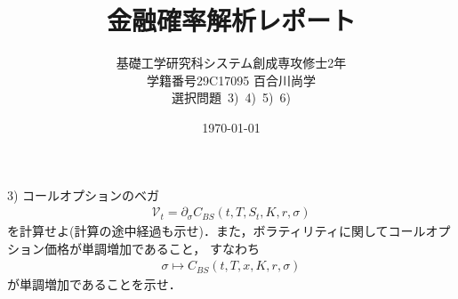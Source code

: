 \documentclass[11pt,a4paper]{jsarticle}
\title{金融確率解析レポート}
\author{基礎工学研究科システム創成専攻修士2年\\学籍番号29C17095 百合川尚学\\選択問題\ 3)\ 4)\ 5)\ 6)}
\date{\today}
\theoremstyle{mystyle}
\begin{document}
\maketitle

\begin{itembox}[l]{3)}
	コールオプションのベガ
	\begin{align}
		\mathcal{V}_{t} = \partial_{\sigma}C_{BS}(t,T,S_{t},K,r,\sigma)
	\end{align}
	を計算せよ(計算の途中経過も示せ)．また，ボラティリティに関してコールオプション価格が単調増加であること，
	すなわち
	\begin{align}
		\sigma \longmapsto C_{BS}(t,T,x,K,r,\sigma)
	\end{align}
	が単調増加であることを示せ．
\end{itembox}
\end{document}
